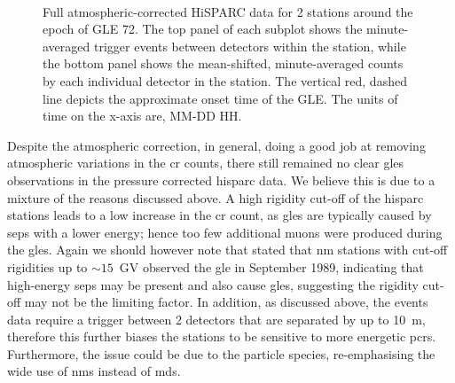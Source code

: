 \begin{figure}[ht]
	\centering
	 \\
	
	
	\caption{Full atmospheric-corrected HiSPARC data for 2 stations around the epoch of GLE 72. The top panel of each subplot shows the minute-averaged trigger events between detectors within the station, while the bottom panel shows the mean-shifted, minute-averaged counts by each individual detector in the station. The vertical red, dashed line depicts the approximate onset time of the GLE. The units of time on the x-axis are, MM-DD HH.}
	\label{fig:GLE_72_Pcorr}
\end{figure}

Despite the atmospheric correction, in general, doing a good job at removing atmospheric variations in the \gls{cr} counts, there still remained no clear \glspl{gle} observations in the pressure corrected \gls{hisparc} data. We believe this is due to a mixture of the reasons discussed above. A high rigidity cut-off of the \gls{hisparc} stations leads to a low increase in the \gls{cr} count, as \glspl{gle} are typically caused by \glspl{sep} with a lower energy; hence too few additional muons were produced during the \glspl{gle}. Again we should however note that \citet{humble_j._e._detection_2012} stated that \gls{nm} stations with cut-off rigidities up to $\sim 15$~GV observed the \gls{gle} in September 1989, indicating that high-energy \glspl{sep} may be present and also cause \glspl{gle}, suggesting the rigidity cut-off may not be the limiting factor. In addition, as discussed above, the events data require a trigger between 2 detectors that are separated by up to 10~m, therefore this further biases the stations to be sensitive to more energetic \glspl{pcr}. Furthermore, the issue could be due to the particle species, re-emphasising the wide use of \glspl{nm} instead of \glspl{md}.

